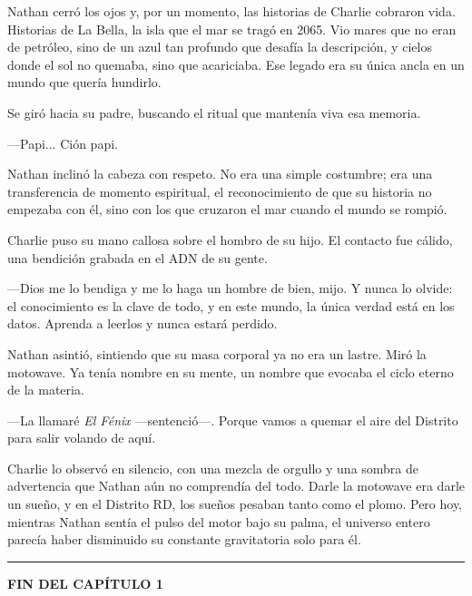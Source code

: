 \documentclass[12pt,a4paper]{book}
\begin{document}
Nathan cerró los ojos y, por un momento, las historias de Charlie cobraron vida. Historias de La Bella, la isla que el mar se tragó en 2065. Vio mares que no eran de petróleo, sino de un azul tan profundo que desafía la descripción, y cielos donde el sol no quemaba, sino que acariciaba. Ese legado era su única ancla en un mundo que quería hundirlo.

Se giró hacia su padre, buscando el ritual que mantenía viva esa memoria.

---Papi... Ción papi.

Nathan inclinó la cabeza con respeto. No era una simple costumbre; era una transferencia de momento espiritual, el reconocimiento de que su historia no empezaba con él, sino con los que cruzaron el mar cuando el mundo se rompió.

Charlie puso su mano callosa sobre el hombro de su hijo. El contacto fue cálido, una bendición grabada en el ADN de su gente.

---Dios me lo bendiga y me lo haga un hombre de bien, mijo. Y nunca lo olvide: el conocimiento es la clave de todo, y en este mundo, la única verdad está en los datos. Aprenda a leerlos y nunca estará perdido.

Nathan asintió, sintiendo que su masa corporal ya no era un lastre. Miró la motowave. Ya tenía nombre en su mente, un nombre que evocaba el ciclo eterno de la materia.

---La llamaré \textit{El Fénix} ---sentenció---. Porque vamos a quemar el aire del Distrito para salir volando de aquí.

Charlie lo observó en silencio, con una mezcla de orgullo y una sombra de advertencia que Nathan aún no comprendía del todo. Darle la motowave era darle un sueño, y en el Distrito RD, los sueños pesaban tanto como el plomo. Pero hoy, mientras Nathan sentía el pulso del motor bajo su palma, el universo entero parecía haber disminuido su constante gravitatoria solo para él.

\bigskip
\noindent\rule{\textwidth}{0.4pt}
\bigskip

\textbf{FIN DEL CAPÍTULO 1}
\end{document}
